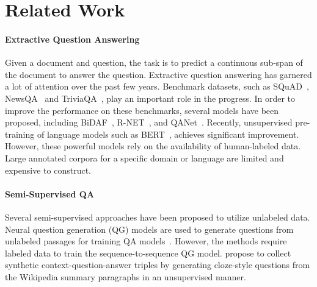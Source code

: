 \documentclass[11pt,a4paper]{article}
\begin{document}
\section{Related Work}

\paragraph{Extractive Question Answering}
Given a document and question, the task is to predict a continuous sub-span of the document to answer the question. 
Extractive question answering has garnered a lot of attention over the past few years. 
Benchmark datasets, such as SQuAD~\citep{squad1,squad2}, NewsQA~\citep{newsqa2017} and TriviaQA~\citep{triviaqa}, play an important role in the progress.
In order to improve the performance on these benchmarks, several models have been proposed, including BiDAF~\citep{bidaf}, R-NET~\citep{wang-rnet}, and QANet~\citep{qanet}. 
Recently, unsupervised pre-training of language models such as BERT~\citep{BERT}, 
achieves significant improvement. 
However, these powerful models rely on the availability of human-labeled data. Large annotated corpora for a specific domain or language are limited and expensive to construct.

\paragraph{Semi-Supervised QA} 
Several semi-supervised approaches have been proposed to utilize unlabeled data.
Neural question generation (QG) models are used to generate questions from unlabeled passages for training QA models~\cite{yang-semiqa,unans-qg,syntheticqa,unilm}. However, the methods require labeled data to train the sequence-to-sequence QG model. 
\citet{dhingra2019semi} propose to collect synthetic context-question-answer triples by generating cloze-style questions from the Wikipedia summary paragraphs in an unsupervised manner. 
\end{document}
